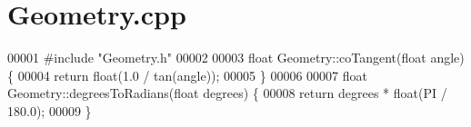 \section{Geometry.\+cpp}
\label{_geometry_8cpp_source}

\begin{DoxyCode}
00001 \textcolor{preprocessor}{#include "Geometry.h"}
00002 
00003 \textcolor{keywordtype}{float} Geometry::coTangent(\textcolor{keywordtype}{float} angle) \{
00004     \textcolor{keywordflow}{return} float(1.0 / tan(angle));
00005 \}
00006 
00007 \textcolor{keywordtype}{float} Geometry::degreesToRadians(\textcolor{keywordtype}{float} degrees) \{
00008     \textcolor{keywordflow}{return} degrees * float(PI / 180.0);
00009 \}
\end{DoxyCode}
